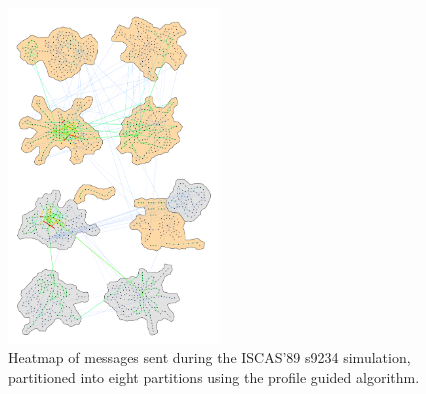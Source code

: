 \documentclass[11pt]{book}
\begin{document}
\begin{figure}
\centering
\includegraphics[clip=true,width=0.5\textwidth]{figs/s9234_8part.pdf}
\caption{Heatmap of messages sent during the ISCAS'89 s9234 simulation, partitioned into eight partitions using the profile guided algorithm.}
\end{figure}


 \markright{ }
\end{document}
